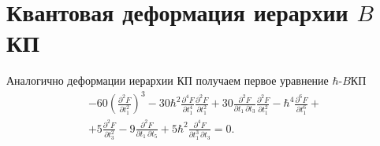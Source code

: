 \documentclass[a5paper,twoside]{article}
\numberwithin{equation}{section}
\begin{document}
\section{Квантовая деформация иерархии $B$КП}
Аналогично деформации иерархии КП получаем первое уравнение $\hbar $-$B$КП
\begin{multline}
-60 \left(\frac{\partial ^2F}{\partial
   t_1^2}\right)^3-30\hbar ^2 \frac{\partial ^4F}{\partial
   t_1^4} \frac{\partial ^2F}{\partial
   t_1^2}+30 \frac{\partial ^2F}{\partial t_1\, \partial t_3}
   \frac{\partial ^2F}{\partial t_1^2}-\hbar ^4\frac{\partial
   ^6F}{\partial t_1^6}+\\+5 \frac{\partial ^2F}{\partial
   t_3^2}-9 \frac{\partial ^2F}{\partial t_1\, \partial t_5}+5
   \hbar ^2\frac{\partial ^4F}{\partial t_1^3\, \partial t_3}=0	
	\label{}
.\end{multline}
\end{document}
